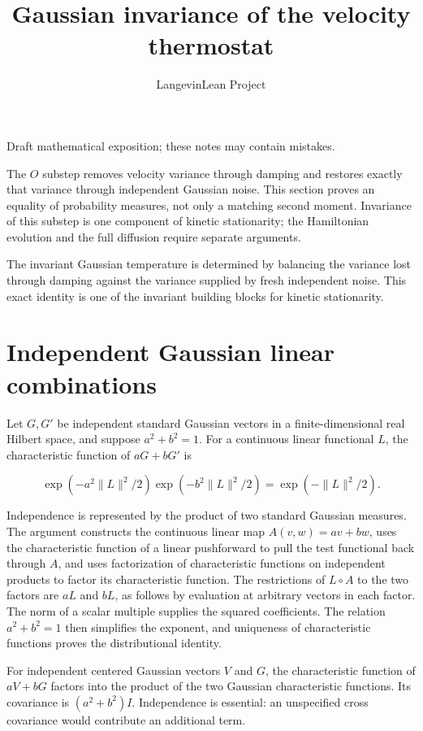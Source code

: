 \documentclass[11pt,a4paper]{article}
\title{\texorpdfstring{Gaussian invariance of the velocity thermostat}{Gaussian invariance of the velocity thermostat}}
\author{LangevinLean Project}
\date{}
\begin{document}
\maketitle
Draft mathematical exposition; these notes may contain mistakes.


The \(O\) substep removes velocity variance through damping and restores exactly that variance through independent Gaussian noise. This section proves an equality of probability measures, not only a matching second moment. Invariance of this substep is one component of kinetic stationarity; the Hamiltonian evolution and the full diffusion require separate arguments.



The invariant Gaussian temperature is determined by balancing the variance lost through damping against the variance supplied by fresh independent noise. This exact identity is one of the invariant building blocks for kinetic stationarity.


\section{\texorpdfstring{Independent Gaussian linear combinations}{Independent Gaussian linear combinations}}


Let \(G,G\prime\) be independent standard Gaussian vectors in a finite-dimensional real Hilbert space, and suppose \(a^2+b^2=1\). For a continuous linear functional \(L\), the characteristic function of \(aG+bG\prime\) is

\[\exp(-a^2\|L\|^2/2)\exp(-b^2\|L\|^2/2)=\exp(-\|L\|^2/2).\]

Independence is represented by the product of two standard Gaussian measures. The argument constructs the continuous linear map \(A(v,w)=av+bw\), uses the characteristic function of a linear pushforward to pull the test functional back through \(A\), and uses factorization of characteristic functions on independent products to factor its characteristic function. The restrictions of \(L\circ A\) to the two factors are \(aL\) and \(bL\), as follows by evaluation at arbitrary vectors in each factor. The norm of a scalar multiple supplies the squared coefficients. The relation \(a^2+b^2=1\) then simplifies the exponent, and uniqueness of characteristic functions proves the distributional identity.



For independent centered Gaussian vectors \(V\) and \(G\), the characteristic function of \(aV+bG\) factors into the product of the two Gaussian characteristic functions. Its covariance is \((a^2+b^2)I\). Independence is essential: an unspecified cross covariance would contribute an additional term.
\end{document}
